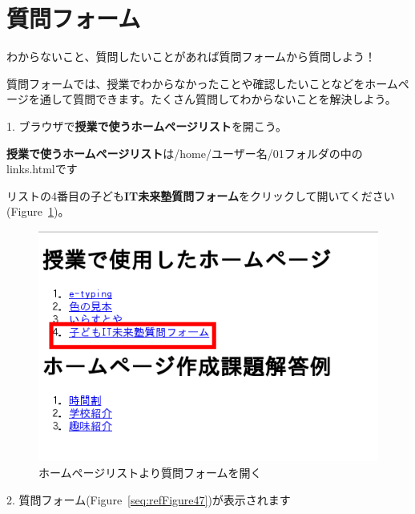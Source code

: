 \clearpage
\section{質問フォーム}

わからないこと、質問したいことがあれば質問フォームから質問しよう！

質問フォームでは、授業でわからなかったことや確認したいことなどをホームページを通して質問できます。たくさん質問してわからないことを解決しよう。

1.
ブラウザで\textbf{授業で使うホームページリスト}を開こう。

\textbf{授業で使うホームページリスト}は/home/ユーザー名/01フォルダの中のlinks.htmlです

リストの4番目の子ども\textbf{IT未来塾質問フォーム}をクリックして開いてください(Figure~\ref{seq:refFigure46})。


\begin{figure}[H]
    \begin{center}
        \includegraphics[width=11.231cm,height=7.613cm]{text02-img/textbook-img245.png}
        \caption{ホームページリストより質問フォームを開く}
        \label{seq:refFigure46}
    \end{center}
\end{figure}

2.
質問フォーム(Figure~\ref{seq:refFigure47})が表示されます

